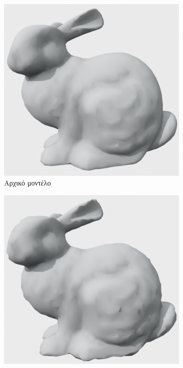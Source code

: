 \documentclass{article}
\begin{document}
\begin{figure}[h]
	\centering
	\begin{subfigure}{0.4\textwidth}
		\includegraphics[width=\textwidth]{"original_model.png"}
		\caption{Αρχικό μοντέλο}
	\end{subfigure}
	\begin{subfigure}{0.4\textwidth}
		\includegraphics[width=\textwidth]{"gaussian_noise.png"}

\end{subfigure}
\end{figure}
\end{document}
